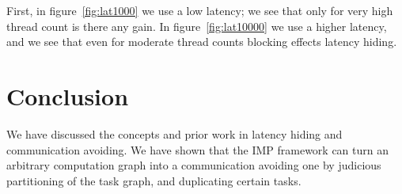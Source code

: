 \documentclass[11pt,fleqn]{article}
\begin{document}
First, in figure~\ref{fig:lat1000} we use a low latency; we see that
only for very high thread count is there any gain. In
figure~\ref{fig:lat10000} we use a higher latency, and we see that
even for moderate thread counts blocking effects latency hiding.


\section{Conclusion}

We have discussed the concepts and prior work in latency hiding and
communication avoiding. We have shown that the IMP framework can turn
an arbitrary computation graph into a communication avoiding one by
judicious partitioning of the task graph, and duplicating certain tasks.



\end{document}
